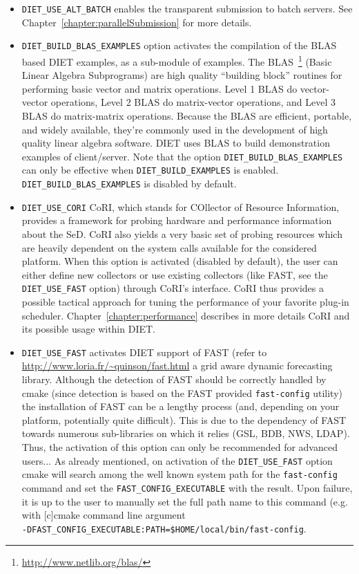 \begin{itemize}
\item
  \verb+DIET_USE_ALT_BATCH+ enables the transparent submission to batch servers. See Chapter~\ref{chapter:parallelSubmission} for more details.

\item
  \verb+DIET_BUILD_BLAS_EXAMPLES+ option activates the compilation of
  the BLAS based DIET examples, as a sub-module of examples.
  The BLAS~\footnote{\url{http://www.netlib.org/blas/}} (Basic Linear
  Algebra Subprograms) are high quality ``building block'' routines for
  performing basic vector and matrix operations.
  Level 1 BLAS do vector-vector operations, Level 2 BLAS do matrix-vector
  operations, and Level 3 BLAS do matrix-matrix operations.
  Because the BLAS are efficient, portable, and widely available,
  they're commonly used in the development of high quality linear algebra
  software.
  DIET uses BLAS to build demonstration examples of client/server.
  Note that the option \verb+DIET_BUILD_BLAS_EXAMPLES+ can only be
  effective when \verb+DIET_BUILD_EXAMPLES+ is enabled.
  \verb+DIET_BUILD_BLAS_EXAMPLES+ is disabled by default.

\item
  \verb+DIET_USE_CORI+ CoRI, which stands for COllector of Resource
  Information, provides a framework for probing hardware and performance
  information about the SeD.
  CoRI also yields a very basic set of probing resources which are
  heavily dependent on the system calls available for the considered platform.
  When this option is activated (disabled by default), the user can either
  define new collectors or use existing collectors (like FAST, see the
  \verb+DIET_USE_FAST+ option) through CoRI's interface.
  CoRI thus provides a possible tactical approach for tuning the performance
  of your favorite plug-in scheduler.
  Chapter~\ref{chapter:performance} describes in more details CoRI and its
  possible usage within DIET.

\item
  \verb+DIET_USE_FAST+ activates DIET support of FAST (refer to
  \url{http://www.loria.fr/~quinson/fast.html} a grid aware dynamic
  forecasting library.
  Although the detection of FAST should be correctly handled by cmake
  (since detection is based on the FAST provided \verb+fast-config+ utility)
  the installation of FAST can be a lengthy process (and, depending on your
  platform, potentially quite difficult).
  This is due to the dependency of FAST towards numerous sub-libraries on
  which it relies (GSL, BDB, NWS, LDAP).
  Thus, the activation of this option can only be recommended for advanced
  users...
  As already mentioned, on activation of the \verb+DIET_USE_FAST+ option
  cmake will search among the well known system path for the
  \verb+fast-config+ command and set the \verb+FAST_CONFIG_EXECUTABLE+ 
  with the result. Upon failure, it is up to the user to manually set the
  full path name to this command (e.g. with [c]cmake command line argument \\
  \verb+-DFAST_CONFIG_EXECUTABLE:PATH=$HOME/local/bin/fast-config+.


\end{itemize}
